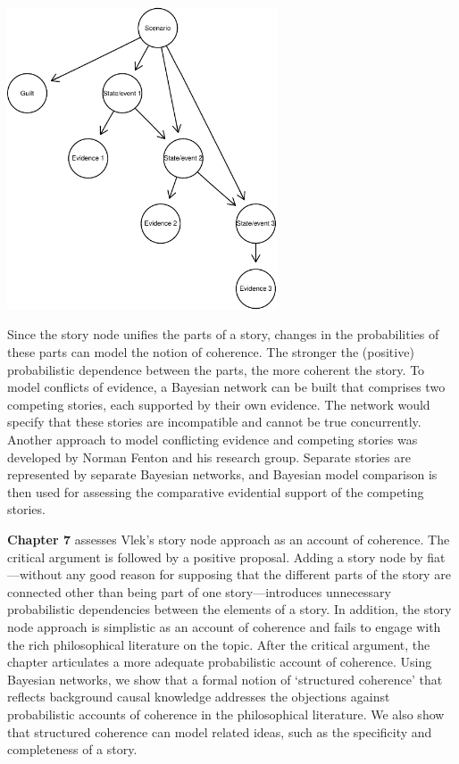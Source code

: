 \documentclass[
  10pt,
  dvipsnames,enabledeprecatedfontcommands]{scrartcl}
\begin{document}
\begin{center}
\includegraphics[width=8cm]{vlek-scenario-node.pdf}
 \end{center}

\vspace{-2mm}

\noindent Since the story node unifies the parts of a story, changes in
the probabilities of these parts can model the notion of coherence. The
stronger the (positive) probabilistic dependence between the parts, the
more coherent the story. To model conflicts of evidence, a Bayesian
network can be built that comprises two competing stories, each
supported by their own evidence. The network would specify that these
stories are incompatible and cannot be true concurrently. Another
approach to model conflicting evidence and competing stories was
developed by Norman Fenton and his research group. Separate stories are
represented by separate Bayesian networks, and Bayesian model comparison
is then used for assessing the comparative evidential support of the
competing stories.

\textbf{Chapter 7} assesses Vlek's story node approach as an account of
coherence. The critical argument is followed by a positive proposal.
Adding a story node by fiat---without any good reason for supposing that
the different parts of the story are connected other than being part of
one story---introduces unnecessary probabilistic dependencies between
the elements of a story. In addition, the story node approach is
simplistic as an account of coherence and fails to engage with the rich
philosophical literature on the topic. After the critical argument, the
chapter articulates a more adequate probabilistic account of coherence.
Using Bayesian networks, we show that a formal notion of `structured
coherence' that reflects background causal knowledge addresses the
objections against probabilistic accounts of coherence in the
philosophical literature. We also show that structured coherence can
model related ideas, such as the specificity and completeness of a
story.
\end{document}
